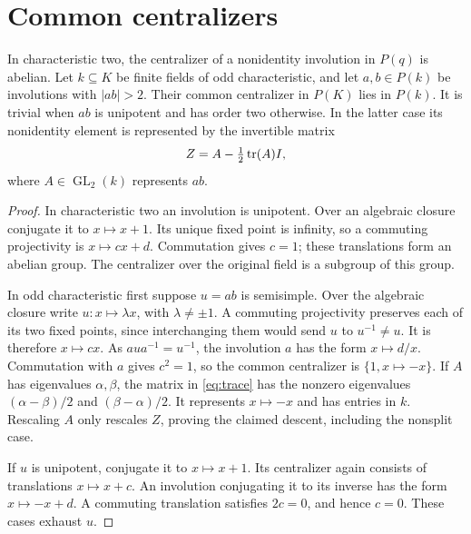 \section{Common centralizers}
\begin{lemma}\label{lemma:centralizer}
In characteristic two, the centralizer of a nonidentity involution in
$P(q)$ is abelian. Let $k\subseteq K$ be finite fields of odd characteristic,
and let $a,b\in P(k)$ be involutions with $|ab|>2$. Their common centralizer
in $P(K)$ lies in $P(k)$. It is trivial when $ab$ is unipotent and has
order two otherwise. In the latter case its nonidentity element is represented
by the invertible matrix
\begin{equation}\label{eq:trace}
 Z=A-\tfrac12\operatorname{tr}(A)I,
\end{equation}
where $A\in\operatorname{GL}_2(k)$ represents $ab$.
\end{lemma}
\begin{proof}
In characteristic two an involution is unipotent. Over an algebraic closure
conjugate it to $x\mapsto x+1$. Its unique fixed point is infinity, so a
commuting projectivity is $x\mapsto cx+d$. Commutation gives $c=1$;
these translations form an abelian group. The centralizer over the original
field is a subgroup of this group.

In odd characteristic first suppose $u=ab$ is semisimple. Over the algebraic
closure write $u:x\mapsto\lambda x$, with $\lambda\ne\pm1$.
A commuting projectivity preserves each of its two fixed points, since
interchanging them would send $u$ to $u^{-1}\ne u$. It is therefore
$x\mapsto cx$. As $aua^{-1}=u^{-1}$, the involution $a$ has the form
$x\mapsto d/x$. Commutation with $a$ gives $c^2=1$, so the common
centralizer is $\{1,x\mapsto-x\}$. If $A$ has eigenvalues
$\alpha,\beta$, the matrix in \eqref{eq:trace} has the nonzero eigenvalues
$(\alpha-\beta)/2$ and $(\beta-\alpha)/2$. It represents $x\mapsto-x$
and has entries in $k$. Rescaling $A$ only rescales $Z$, proving the
claimed descent, including the nonsplit case.

If $u$ is unipotent, conjugate it to $x\mapsto x+1$. Its centralizer again
consists of translations $x\mapsto x+c$. An involution conjugating it to
its inverse has the form $x\mapsto-x+d$. A commuting translation satisfies
$2c=0$, and hence $c=0$. These cases exhaust $u$.
\end{proof}

